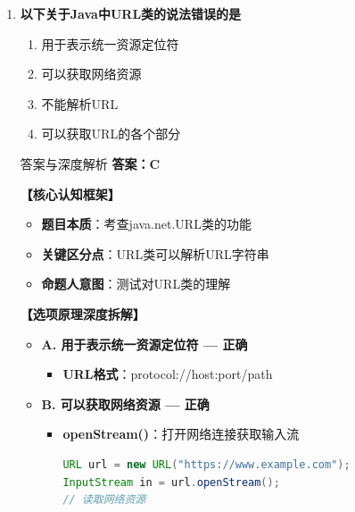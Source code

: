\documentclass[12pt, a4paper]{ctexart}
\begin{document}
\begin{enumerate}[label=\textbf{\arabic*.}]
\begin{bluebox}{答案与深度解析}
\begin{enumerate}[leftmargin=*, nosep]
			      \item \textbf{注意}：write后要flush确保数据发出
		      \end{enumerate}

		      \textbf{【命题趋势与实战策略】}

		      \textbf{考场秒杀技巧}：Socket发送用OutputStream.write()
	      \end{bluebox}

	\item \textbf{以下关于Java中URL类的说法错误的是}
	      \begin{enumerate}[label=\Alph*.]
		      \item 用于表示统一资源定位符
		      \item 可以获取网络资源
		      \item 不能解析URL
		      \item 可以获取URL的各个部分
	      \end{enumerate}

	      \begin{bluebox}{答案与深度解析}
		      \textbf{答案：C}

		      \textbf{【核心认知框架】}
		      \begin{itemize}[label={}, leftmargin=*, nosep]
			      \item \textbf{题目本质}：考查java.net.URL类的功能
			      \item \textbf{关键区分点}：URL类可以解析URL字符串
			      \item \textbf{命题人意图}：测试对URL类的理解
		      \end{itemize}

		      \textbf{【选项原理深度拆解】}
					  \begin{itemize}[label={}, leftmargin=*, nosep]

		      \item \textbf{A. 用于表示统一资源定位符 — 正确}
		      \begin{itemize}[label={}, leftmargin=*, nosep]
			      \item \textbf{URL格式}：protocol://host:port/path
		      \end{itemize}

		      \item \textbf{B. 可以获取网络资源 — 正确}
		      \begin{itemize}[label={}, leftmargin=*, nosep]
			      \item \textbf{openStream()}：打开网络连接获取输入流
			            \begin{lstlisting}[language=Java]
URL url = new URL("https://www.example.com");
InputStream in = url.openStream();
// 读取网络资源
      \end{lstlisting}
		      \end{itemize}


\end{itemize}
\end{bluebox}
\end{enumerate}
\end{document}
